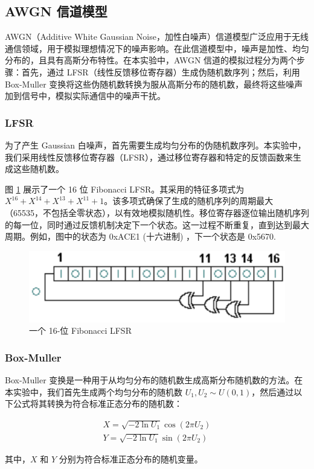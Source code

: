 \subsection{AWGN 信道模型}

AWGN（Additive White Gaussian Noise，加性白噪声）信道模型广泛应用于无线通信领域，用于模拟理想情况下的噪声影响。在此信道模型中，噪声是加性、均匀分布的，且具有高斯分布特性。在本实验中，AWGN 信道的模拟过程分为两个步骤：首先，通过 LFSR（线性反馈移位寄存器）生成伪随机数序列；然后，利用 Box-Muller 变换将这些伪随机数转换为服从高斯分布的随机数，最终将这些噪声加到信号中，模拟实际通信中的噪声干扰。

\subsubsection{LFSR}

为了产生 Gaussian 白噪声，首先需要生成均匀分布的伪随机数序列。本实验中，我们采用线性反馈移位寄存器（LFSR），通过移位寄存器和特定的反馈函数来生成这些随机数。

图 \ref{fig:lfsr_model} 展示了一个 16 位 Fibonacci LFSR。其采用的特征多项式为 $X^{16} + X^{14} + X^{13} + X^{11} + 1$。该多项式确保了生成的随机序列的周期最大（65535，不包括全零状态），以有效地模拟随机性。移位寄存器逐位输出随机序列的每一位，同时通过反馈机制决定下一个状态。这一过程不断重复，直到达到最大周期。例如，图中的状态为 0xACE1 (十六进制) ，下一个状态是 0x5670.

\begin{figure}[ht]
    \centering
    \includegraphics[width=.6\textwidth]{static/lfsr_model.png}
    \caption{一个 16-位 Fibonacci LFSR}
    \label{fig:lfsr_model}
\end{figure}

\subsubsection{Box-Muller}

Box-Muller 变换是一种用于从均匀分布的随机数生成高斯分布随机数的方法。在本实验中，我们首先生成两个均匀分布的随机数 $U_1, U_2 \sim U(0, 1)$，然后通过以下公式将其转换为符合标准正态分布的随机数：

$$
\begin{aligned}
X = \sqrt{-2\ln U_1} \cos(2\pi U_2) \\
Y = \sqrt{-2\ln U_1} \sin(2\pi U_2)
\end{aligned}
$$

其中，$X$ 和 $Y$ 分别为符合标准正态分布的随机变量。
